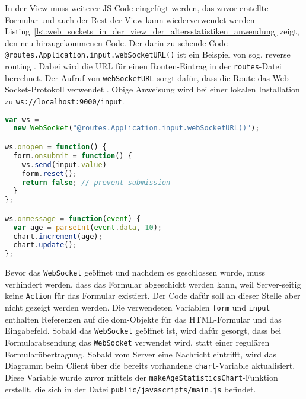 In der View muss weiterer JS-Code eingefügt werden, das zuvor erstellte Formular und auch der Rest der View kann wiederverwendet werden
Listing~\ref{lst:web_sockets_in_der_view_der_altersstatistiken_anwendung} zeigt, den neu hinzugekommenen Code.
Der darin zu sehende Code \lstinline|@routes.Application.input.webSocketURL()| ist ein Beispiel von sog. reverse routing \cite[vgl.][S.~98]{play_for_scala}.
Dabei wird die URL für einen Routen-Eintrag in der \lstinline|routes|-Datei berechnet.
Der Aufruf von \lstinline|webSocketURL| sorgt dafür, dass die Route das Web-Socket-Protokoll verwendet \cite[vgl.][S.~281]{play_for_scala}.
Obige Anweisung wird bei einer lokalen Installation zu \lstinline[language=sh]|ws://localhost:9000/input|.

\begin{lstlisting}[language=javascript, caption=Web-Sockets in der View der Altersstatistiken-Anwendung, label=lst:web_sockets_in_der_view_der_altersstatistiken_anwendung]
var ws =
  new WebSocket("@routes.Application.input.webSocketURL()");

ws.onopen = function() {
  form.onsubmit = function() {
    ws.send(input.value)
    form.reset();
    return false; // prevent submission
  }
};

ws.onmessage = function(event) {
  var age = parseInt(event.data, 10);
  chart.increment(age);
  chart.update();
};
\end{lstlisting}

Bevor das \lstinline|WebSocket| geöffnet und nachdem es geschlossen wurde, muss verhindert werden, dass das Formular abgeschickt werden kann, weil Server-seitig keine \lstinline|Action| für das Formular existiert.
Der Code dafür soll an dieser Stelle aber nicht gezeigt werden werden.
Die verwendeten Variablen \lstinline|form| und \lstinline|input| enthalten Referenzen auf die \gls{dom}-Objekte für das HTML-Formular und das Eingabefeld.
Sobald das \lstinline|WebSocket| geöffnet ist, wird dafür gesorgt, dass bei Formularabsendung das \lstinline|WebSocket| verwendet wird, statt einer regulären Formularübertragung.
Sobald vom Server eine Nachricht eintrifft, wird das Diagramm beim Client über die bereits vorhandene \lstinline|chart|-Variable aktualisiert.
Diese Variable wurde zuvor mittels der \lstinline|makeAgeStatisticsChart|-Funktion erstellt, die sich in der Datei \lstinline|public/javascripts/main.js| befindet.



